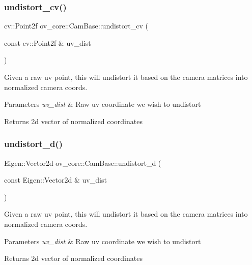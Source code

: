 \subsubsection{\texorpdfstring{undistort\+\_\+cv()}{undistort\_cv()}}
{\footnotesize\ttfamily cv\+::\+Point2f ov\+\_\+core\+::\+Cam\+Base\+::undistort\+\_\+cv (\begin{DoxyParamCaption}\item[{const cv\+::\+Point2f \&}]{uv\+\_\+dist }\end{DoxyParamCaption})\hspace{0.3cm}{\ttfamily [inline]}}



Given a raw uv point, this will undistort it based on the camera matrices into normalized camera coords. 


\begin{DoxyParams}{Parameters}
{\em uv\+\_\+dist} & Raw uv coordinate we wish to undistort \\
\hline
\end{DoxyParams}
\begin{DoxyReturn}{Returns}
2d vector of normalized coordinates 
\end{DoxyReturn}
\mbox{\label{classov__core_1_1CamBase_ab910cf55ee13ca74eb4b8463ab32f1c4}} 
\subsubsection{\texorpdfstring{undistort\+\_\+d()}{undistort\_d()}}
{\footnotesize\ttfamily Eigen\+::\+Vector2d ov\+\_\+core\+::\+Cam\+Base\+::undistort\+\_\+d (\begin{DoxyParamCaption}\item[{const Eigen\+::\+Vector2d \&}]{uv\+\_\+dist }\end{DoxyParamCaption})\hspace{0.3cm}{\ttfamily [inline]}}



Given a raw uv point, this will undistort it based on the camera matrices into normalized camera coords. 


\begin{DoxyParams}{Parameters}
{\em uv\+\_\+dist} & Raw uv coordinate we wish to undistort \\
\hline
\end{DoxyParams}
\begin{DoxyReturn}{Returns}
2d vector of normalized coordinates 
\end{DoxyReturn}
\mbox{\label{classov__core_1_1CamBase_ad0db03f97e5a12f5ad757f72e60f50e4}} 
